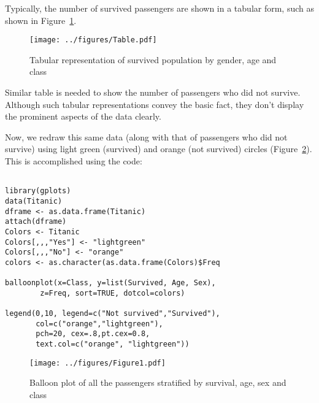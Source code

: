\documentclass[a4paper]{report}
\begin{document}
\begin{article}


Typically, the number of survived passengers are shown in a
tabular form, such as shown in Figure~\ref{figure:Table}.

\begin{figure}
\texttt{[image: ../figures/Table.pdf]}
\caption{\label{figure:Table}
Tabular representation of survived population by gender, age and class}
\end{figure}

Similar table is needed to show the number of passengers who did
not survive. Although such tabular representations convey the basic
fact, they don't display the prominent aspects of the data clearly.

Now, we redraw this same data (along with that of passengers who did
not survive) using light green (survived) and orange (not survived) circles
(Figure~\ref{figure:Figure1}).  This is accomplished using the code:

{\small
\begin{verbatim}

library(gplots)
data(Titanic)
dframe <- as.data.frame(Titanic) 
attach(dframe)
Colors <- Titanic
Colors[,,,"Yes"] <- "lightgreen"
Colors[,,,"No"] <- "orange"
colors <- as.character(as.data.frame(Colors)$Freq

balloonplot(x=Class, y=list(Survived, Age, Sex), 
	    z=Freq, sort=TRUE, dotcol=colors)

legend(0,10, legend=c("Not survived","Survived"),
       col=c("orange","lightgreen"),
       pch=20, cex=.8,pt.cex=0.8,
       text.col=c("orange", "lightgreen"))
\end{verbatim}
 }

\begin{figure}
\texttt{[image: ../figures/Figure1.pdf]}
\caption{\label{figure:Figure1}
Balloon plot of all the passengers stratified by survival, age, sex
and class}
\end{figure}


\end{article}
\end{document}
